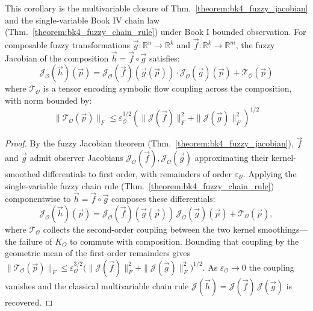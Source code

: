 
\begin{corollary}
\label{corollary:bk4_fuzzy_multivariable_chain}
This corollary is the multivariable closure of Thm.~\ref{theorem:bk4_fuzzy_jacobian} and the single-variable Book IV chain law (Thm.~\ref{theorem:bk4_fuzzy_chain_rule}) under Book I bounded observation.
For composable fuzzy transformations $\vec{g}: \mathbb{R}^n \to \mathbb{R}^k$ and $\vec{f}: \mathbb{R}^k \to \mathbb{R}^m$, the fuzzy Jacobian of the composition $\vec{h} = \vec{f} \circ \vec{g}$ satisfies:
\[
\mathcal{J}_{\mathcal{O}}(\vec{h})(\vec{p}) = \mathcal{J}_{\mathcal{O}}(\vec{f})(\vec{g}(\vec{p})) \cdot \mathcal{J}_{\mathcal{O}}(\vec{g})(\vec{p}) + \mathcal{T}_{\mathcal{O}}(\vec{p})
\]
where $\mathcal{T}_{\mathcal{O}}$ is a tensor encoding symbolic flow coupling across the composition, with norm bounded by:
\[
\|\mathcal{T}_{\mathcal{O}}(\vec{p})\|_F \leq \varepsilon_{\mathcal{O}}^{3/2} \left( \|\mathcal{J}(\vec{f})\|_F^2 + \|\mathcal{J}(\vec{g})\|_F^2 \right)^{1/2}
\]
\end{corollary}

\begin{proof}
\label{proof:bk4_fuzzy_multivariable_chain}
\leavevmode
By the fuzzy Jacobian theorem (Thm.~\ref{theorem:bk4_fuzzy_jacobian}), $\vec{f}$ and $\vec{g}$ admit observer Jacobians $\mathcal{J}_{\mathcal{O}}(\vec{f}), \mathcal{J}_{\mathcal{O}}(\vec{g})$ approximating their kernel-smoothed differentials to first order, with remainders of order $\varepsilon_{\mathcal{O}}$. Applying the single-variable fuzzy chain rule (Thm.~\ref{theorem:bk4_fuzzy_chain_rule}) componentwise to $\vec{h} = \vec{f}\circ\vec{g}$ composes these differentials:
\[
\mathcal{J}_{\mathcal{O}}(\vec{h})(\vec{p}) = \mathcal{J}_{\mathcal{O}}(\vec{f})(\vec{g}(\vec{p}))\,\mathcal{J}_{\mathcal{O}}(\vec{g})(\vec{p}) + \mathcal{T}_{\mathcal{O}}(\vec{p}),
\]
where $\mathcal{T}_{\mathcal{O}}$ collects the second-order coupling between the two kernel smoothings---the failure of $K_O$ to commute with composition. Bounding that coupling by the geometric mean of the first-order remainders gives $\|\mathcal{T}_{\mathcal{O}}(\vec{p})\|_F \leq \varepsilon_{\mathcal{O}}^{3/2}\bigl(\|\mathcal{J}(\vec{f})\|_F^2 + \|\mathcal{J}(\vec{g})\|_F^2\bigr)^{1/2}$. As $\varepsilon_{\mathcal{O}}\to 0$ the coupling vanishes and the classical multivariable chain rule $\mathcal{J}(\vec{h}) = \mathcal{J}(\vec{f})\,\mathcal{J}(\vec{g})$ is recovered.
\end{proof}

